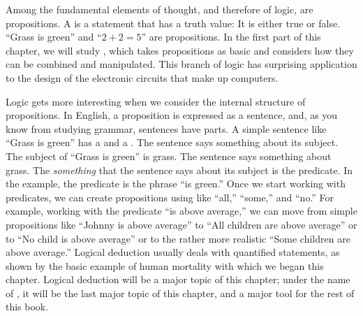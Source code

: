 Among the fundamental elements of thought, and therefore of logic, are
propositions.  A  is a statement that has a truth
value:  It is either true or false.
``Grass is green'' and ``$2 + 2 = 5$''
are propositions.  In the first part of this chapter, we will
study , which takes propositions as basic
and considers how they can be combined and manipulated.  This 
branch of logic has surprising application to the design of
the electronic circuits that make up computers.

Logic gets more interesting when we consider the internal
structure of propositions.  In English, a proposition is expressed as
a sentence, and, as you know from studying grammar, sentences have
parts.  A simple sentence like ``Grass is green'' has a
 and a .  The sentence says something
about its subject.  The subject of ``Grass is green'' is grass.
The sentence says something about grass.  The \emph{something}
that the sentence says about its subject is the predicate.
In the example, the predicate is the phrase ``is green.''
Once we start working with predicates, we can create propositions
using  like ``all,'' ``some,'' and ``no.''
For example, working with the predicate ``is above average,''
we can move from simple propositions like ``Johnny is above
average'' to ``All children are above average'' or to
``No child is above average'' or to the rather more realistic
``Some children are above average.''  Logical deduction usually
deals with quantified statements, as shown by the basic example of
human mortality with which we began this chapter.  Logical deduction
will be a major topic of this chapter;  under the name of
, it will be the last major topic of this chapter,
and a major tool for the
rest of this book.



\endinput




\endinput




